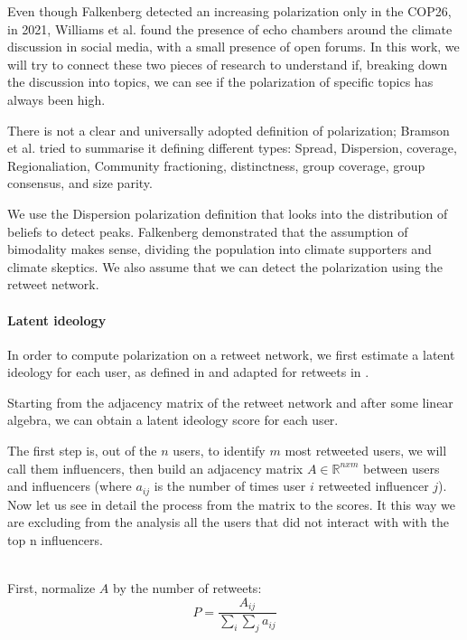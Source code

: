 Even though Falkenberg detected an increasing polarization only in the COP26, in 2021, Williams et al. \cite{williams_network_2015} found the presence of echo chambers around the climate discussion in social media, with a small presence of open forums. In this work, we will try to connect these two pieces of research to understand if, breaking down the discussion into topics, we can see if the polarization of specific topics has always been high. 

There is not a clear and universally adopted definition of polarization; Bramson et al. \cite{bramson_understanding_2017} tried to summarise it defining different types: Spread, Dispersion, coverage, Regionaliation, Community fractioning, distinctness, group coverage, group consensus, and size parity.


 We use the Dispersion polarization definition that looks into the distribution of beliefs to detect peaks. Falkenberg demonstrated that the assumption of bimodality makes sense, dividing the population into climate supporters and climate skeptics. We also assume that we can detect the polarization using the retweet network.

\paragraph{Latent ideology}
In order to compute polarization on a retweet network, we first estimate a latent ideology for each user, as defined in \cite{barbera_birds_2015} and adapted for retweets in \cite{flamino_shifting_2021}.


Starting from the adjacency matrix of the retweet network and after some linear algebra, we can obtain a latent ideology score for each user.

The first step is, out of the $n$ users, to identify $m$ most retweeted users, we will call them influencers, then build an adjacency matrix $A\in \mathbb{R}^{n x m}$ between users and influencers (where \(a_{ij}\) is the number of times user $i$ retweeted influencer $j$). Now let us see in detail the process from the matrix to the scores. It this way we are excluding from the analysis all the users that did not interact with with the top n influencers.

\\

First, normalize $A$ by the number of retweets:
\begin{equation}
P =  \frac{A_{ij}}{\sum_{i} \sum_{j} a_{ij}}
\end{equation}

